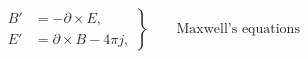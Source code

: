 \documentclass{article}
\begin{document}

\begin{equation*}
\left.\begin{aligned}
B'&=-\partial\times E,\\
E'&=\partial\times B - 4\pi j,
\end{aligned}
\right\}
\qquad \text{Maxwell's equations}
\end{equation*}

\weirdmacro

\end{document}
